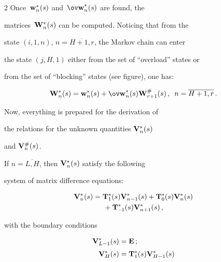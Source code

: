 \begin{multicols}{2}
Once~$\mathbf{w}^*_n(s)$ and~$\bmx{\ov w}^*_n(s)$ are found, the 


matrices~$\mathbf{W}^*_n(s)$ can be computed. Noticing that from the 


state $(i,1,n)$, $n=\overline{H+1,r}$, the Markov chain can enter 


the state $(j,H,1)$ either from the set of ``overload'' states or


from the set of ``blocking'' states (see figure), one has:


$$


\bmx{W}^*_n(s)= \bmx{w}^*_n(s)+\bmx{\ov w}^*_n(s)\bmx{W}^{\#}_{r+1}(s)\,,


\enskip n=\overline{H+1,r}\,.


$$





\columnbreak





Now, everything is prepared for the derivation of


the relations for the unknown quantities $\mathbf{V}^*_n(s)$  


and $\mathbf{V}^{\#}_n(s)$. 


If $n=\overline{L,H}$, then $\mathbf{V}^*_n(s)$ satisfy the following


system of matrix difference equations:


\begin{multline}


\label{V*}


\bmx{V}^*_n(s)


= \bmx{T}^*_1(s)  \bmx{V}^*_{n-1}(s) + 


\bmx{T}^*_0(s) \bmx{V}^*_n(s)\\


{} +  \bmx{T}^*_{-\!1}(s)  \bmx{V}^*_{n+1}(s)\,,


\end{multline}





\noindent with the boundary conditions


\begin{align*}


\bmx{V}^*_{L-1}(s)


&= \bmx{E}\,;


\\[3pt]


\bmx{V}^*_{H}(s)&=  \bmx{T}^*_1(s)  \bmx{V}^*_{H-1}(s)\\



\end{align*}
\end{multicols}
